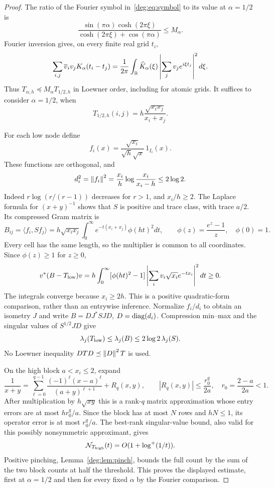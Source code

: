 \begin{proof}
The ratio of the Fourier symbol in~\eqref{deg:eq:symbol} to its value
at $\alpha=1/2$ is
\[
 \frac{\sin(\pi\alpha)\cosh(2\pi\xi)}
      {\cosh(2\pi\xi)+\cos(\pi\alpha)}\le M_\alpha.
\]
Fourier inversion gives, on every finite real grid $t_i$,
\[
 \sum_{i,j}\overline v_i v_jK_\alpha(t_i-t_j)
  =\frac1{2\pi}\int_{\mathbb R}\widehat K_\alpha(\xi)
                   \left|\sum_jv_je^{i\xi t_j}\right|^2d\xi.
\]
Thus $T_{\alpha,h}\preceq M_\alpha T_{1/2,h}$ in Loewner order,
including for atomic grids. It suffices to consider $\alpha=1/2$, when
\[
 T_{1/2,h}(i,j)=h\frac{\sqrt{x_ix_j}}{x_i+x_j}.
\]

For each low node define
\[
 f_i(x)=\frac{\sqrt{x_i}}{\sqrt h\sqrt x}\,1_{I_i}(x).
\]
These functions are orthogonal, and
\[
 d_i^2=\left\lVert f_i\right\rVert^2
   =\frac{x_i}{h}\log\frac{x_i}{x_i-h}\le2\log2.
\]
Indeed $r\log(r/(r-1))$ decreases for $r>1$, and $x_i/h\ge2$.
The Laplace formula for $(x+y)^{-1}$ shows that $S$ is positive and
trace class, with trace $a/2$. Its compressed Gram matrix is
\[
 B_{ij}=\langle f_i,Sf_j\rangle
 =h\sqrt{x_ix_j}\int_0^\infty e^{-t(x_i+x_j)}\phi(ht)^2dt,
 \qquad \phi(z)=\frac{e^z-1}{z},\quad\phi(0)=1.
\]
Every cell has the same length, so the multiplier is common to all
coordinates. Since $\phi(z)\ge1$ for $z\ge0$,
\[
 v^*(B-T_{\rm low})v
 =h\int_0^\infty[\phi(ht)^2-1]
       \left|\sum_i v_i\sqrt{x_i}e^{-tx_i}\right|^2dt\ge0.
\]
The integrals converge because $x_i\ge2h$. This is a positive
quadratic-form comparison, rather than an entrywise inference.
Normalize $f_i/d_i$ to obtain an isometry $J$ and write
$B=D J^*SJ D$, $D=\operatorname{diag}(d_i)$.
Compression min--max and the singular values of $S^{1/2}JD$ give
\[
 \lambda_j(T_{\rm low})\le\lambda_j(B)
                \le2\log2\,\lambda_j(S).
\]
No Loewner inequality $DTD\preceq\left\lVert D\right\rVert^2T$ is used.

On the high block $a<x_i\le2$, expand
\[
 \frac1{x+y}=\sum_{\ell=0}^{q-1}
       \frac{(-1)^\ell(x-a)^\ell}{(a+y)^{\ell+1}}+R_q(x,y),
 \qquad |R_q(x,y)|\le\frac{r_0^q}{2a},\quad
 r_0=\frac{2-a}{2a}<1.
\]
After multiplication by $h\sqrt{xy}$ this is a rank-$q$ matrix
approximation whose entry errors are at most $hr_0^q/a$.
Since the block has at most $N$ rows and $hN\le1$, its operator error
is at most $r_0^q/a$. The best-rank singular-value bound, also valid
for this possibly nonsymmetric approximant, gives
\[
 \mathcal N_{T_{\rm high}}(t)=O(1+\log^+(1/t)).
\]
Positive pinching, Lemma~\ref{deg:lem:pinch}, bounds the full count by
the sum of the two block counts at half the threshold. This proves the
displayed estimate, first at $\alpha=1/2$ and then for every fixed
$\alpha$ by the Fourier comparison.


\end{proof}
